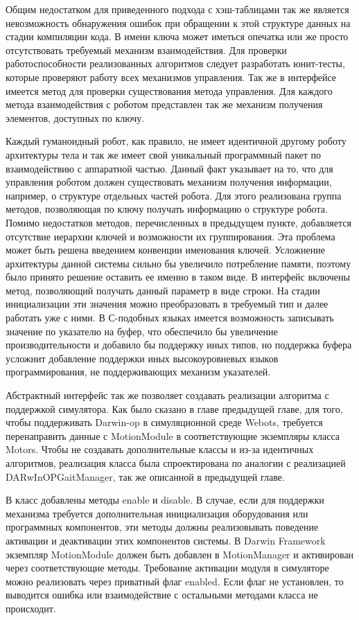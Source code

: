 Общим недостатком для приведенного подхода с хэш-таблицами так же является невозможность обнаружения ошибок при обращении к этой структуре данных на стадии компиляции кода. В имени ключа может иметься опечатка или же просто отсутствовать требуемый механизм взаимодействия. Для проверки работоспособности реализованных алгоритмов следует разработать юнит-тесты, которые проверяют работу всех механизмов управления. Так же в интерфейсе имеется метод для проверки существования метода управления. Для каждого метода взаимодействия с роботом представлен так же механизм получения элементов, доступных по ключу.

Каждый гуманоидный робот, как правило, не имеет идентичной другому роботу архитектуры тела и так же имеет свой уникальный программный пакет по взаимодействию с аппаратной частью. Данный факт указывает на то, что для управления роботом должен существовать механизм получения информации, например, о структуре отдельных частей робота. Для этого реализована группа методов, позволяющая по ключу получать информацию о структуре робота. Помимо недостатков методов, перечисленных в предыдущем пункте, добавляется отсутствие иерархии ключей и возможности их группирования. Эта проблема может быть решена введением конвенции именования ключей. Усложнение архитектуры данной системы сильно бы увеличило потребление памяти, поэтому было принято решение оставить ее именно в таком виде. В интерфейс включены метод, позволяющий получать данный параметр в виде строки. На стадии инициализации эти значения можно преобразовать в требуемый тип и далее работать уже с ними. В С-подобных языках имеется возможность записывать значение по указателю на буфер, что обеспечило бы увеличение производительности и добавило бы поддержку иных типов, но поддержка буфера усложнит добавление поддержки иных высокоуровневых языков программирования, не поддерживающих механизм указателей.

Абстрактный интерфейс так же позволяет создавать реализации алгоритма с поддержкой симулятора. Как было сказано в главе предыдущей главе, для того, чтобы поддерживать Darwin-op в симуляционной среде Webots, требуется перенаправить данные с MotionModule в соответствующие экземпляры класса Motors. Чтобы не создавать дополнительные классы и из-за идентичных алгоритмов, реализация класса была спроектирована по аналогии с реализацией DARwInOPGaitManager, так же описанной в предыдущей главе.

В класс добавлены методы enable и disable. В случае, если для поддержки механизма требуется дополнительная инициализация оборудования или программных компонентов, эти методы должны реализовывать поведение активации и деактивации этих компонентов системы. В Darwin Framework экземпляр MotionModule должен быть добавлен в MotionManager и активирован через соответствующие методы. Требование активации модуля в симуляторе можно реализовать через приватный флаг enabled. Если флаг не установлен, то выводится ошибка или взаимодействие с остальными методами класса не происходит.

